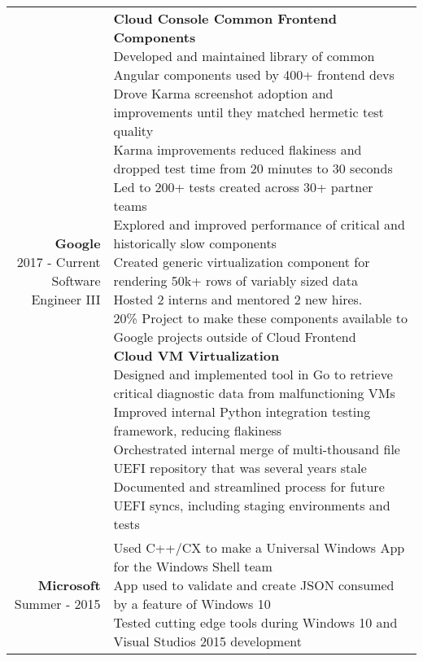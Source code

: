 \documentclass{article}
\makeatletter
\newcommand*\lineBr[2][c]{\begin{tabular}[#1]{@{}r@{}}#2\end{tabular}}
\newcommand*\lineBl[2][c]{\begin{tabular}[#1]{@{}l@{}}#2\end{tabular}}
\makeatother
\begin{document}
\begin{tabularx}{\textwidth}{ r | X }
  \vspace{4mm}
  \lineBr{ {\large {\bf Google }\\[2mm]2017 - Current\\[2mm]Software Engineer III}} &
  \lineBl{
    {\bf Cloud Console Common Frontend Components} \\[2mm]
    Developed and maintained library of common Angular components used by 400+ frontend devs \\[2mm]
    Drove Karma screenshot adoption and improvements until they matched hermetic test quality \\[2mm]
    Karma improvements reduced flakiness and dropped test time from 20 minutes to 30 seconds \\[2mm]
    Led to 200+ tests created across 30+ partner teams \\[2mm]
    Explored and improved performance of critical and historically slow components \\[2mm]
    Created generic virtualization component for rendering 50k+ rows of variably sized data \\[2mm]
    Hosted 2 interns and mentored 2 new hires. \\[2mm]
    20\% Project to make these components available to Google projects outside of Cloud Frontend \\[4mm]
    {\bf Cloud VM Virtualization} \\[2mm]
    Designed and implemented tool in Go to retrieve critical diagnostic data from malfunctioning VMs \\[2mm]
    Improved internal Python integration testing framework, reducing flakiness \\[2mm]
    Orchestrated internal merge of multi-thousand file UEFI repository that was several years stale \\[2mm]
    Documented and streamlined process for future UEFI syncs, including staging environments and tests \\[2mm]
  } \\
  \vspace{4mm}
  \lineBr{ {\large {\bf Microsoft }\\[2mm]Summer - 2015}} &
  \lineBl{
    Used C++/CX to make a Universal Windows App for the Windows Shell team \\[2mm] 
    App used to validate and create JSON consumed by a feature of Windows 10 \\[2mm]
    Tested cutting edge tools during Windows 10 and Visual Studios 2015 development 
}
\end{tabularx}
\end{document}
